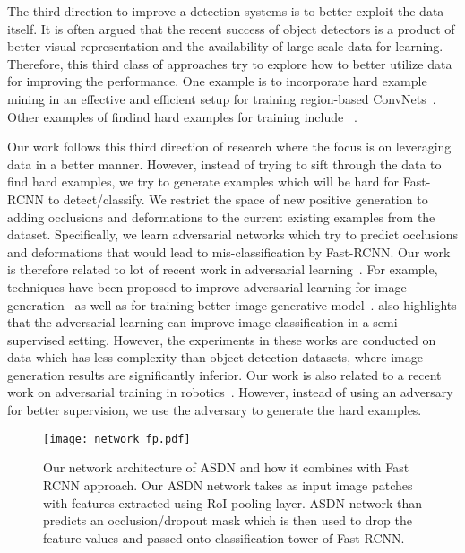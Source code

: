 \documentclass[10pt,twocolumn,letterpaper]{article}
\begin{document}
The third direction to improve a detection systems is to better exploit the data itself. It is often argued that the recent success of object detectors is a product of better visual representation and the availability of large-scale data for learning. Therefore, this third class of approaches try to explore how to better utilize data for improving the performance. One example is to incorporate hard example mining in an effective and efficient setup for training region-based ConvNets~\cite{shrivastavaOHEM}. Other examples of findind hard examples for training include ~\cite{simo2014fracking,wang2015unsupervised,loshchilov2015online}.

Our work follows this third direction of research where the focus is on leveraging data in a better manner. However, instead of trying to sift through the data to find hard examples, we try to generate examples which will be hard for Fast-RCNN to detect/classify. We restrict the space of new positive generation to adding occlusions and deformations to the current existing examples from the dataset. Specifically, we learn adversarial networks which try to predict occlusions and deformations that would lead to mis-classification by Fast-RCNN. Our work is therefore related to lot of recent work in adversarial learning~\cite{goodfellow2014generative,Denton15,Alec15,Mirza15,MathieuCL15,improvedGAN,pathakCVPR16context,CatGAN15,pix2pix2016}. 
For example, techniques have been proposed to improve adversarial learning for image generation~\cite{Alec15} as well as for training better image generative model~\cite{improvedGAN}.
\cite{improvedGAN} also highlights that the adversarial learning can improve image classification in a semi-supervised setting. However, the experiments in these works are conducted on data which has less complexity than object detection datasets, where image generation results are significantly inferior. Our work is also related to a recent work on adversarial training in robotics~\cite{pinto16}. However, instead of using an adversary for better supervision, we use the adversary to generate the hard examples.

 
\begin{figure*}
    \centering
    \texttt{[image: network\_fp.pdf]}
    \caption{Our network architecture of ASDN and how it combines with Fast RCNN approach. Our ASDN network takes as input image patches with features extracted using RoI pooling layer. ASDN network than predicts an occlusion/dropout mask which is then used to drop the feature values and passed onto classification tower of Fast-RCNN.}\label{fig:network}
\end{figure*}
\end{document}
